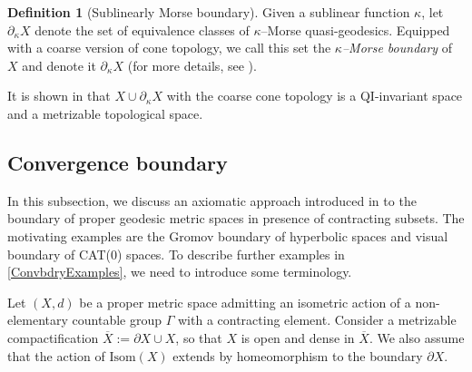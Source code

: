 \documentclass{amsart}
\newtheorem{lem}[thm]{Lemma}
\theoremstyle{definition}
\newtheorem{defn}[thm]{Definition}
\theoremstyle{remark}
\newcommand{\U}{ X}
\newcommand{\bU}{\overline{  X}}
\newcommand{\hU}{\partial_h{  X}}
\newcommand{\pU}{\partial{  X}}
\newcommand{\pka}{\partial_\kappa}
\begin{document}
\begin{defn}[Sublinearly Morse boundary]\label{kappaBdryDefn}
Given a sublinear function $\kappa$, let $\partial_{\kappa}X$ denote the set of equivalence classes of $\kappa$--Morse quasi-geodesics. Equipped with a coarse version of cone topology, we call this set the \emph{$\kappa$--Morse boundary} of $\U$ and denote it $\pka \U$ (for more details, see \cite{QRT2}). 
\end{defn}
It is shown in \cite{QRT2} that $\U\cup \partial_{\kappa}\U$ with the coarse cone topology is a QI-invariant space and a metrizable topological space.

\subsection{Convergence boundary}\label{sec convergence bdry}
In this subsection, we discuss an axiomatic approach introduced in \cite{YANG22} to the boundary of proper geodesic metric spaces in presence of contracting subsets. The motivating examples are the Gromov boundary of hyperbolic spaces and visual boundary of CAT(0) spaces.   To  describe  further examples in \ref{ConvbdryExamples}, we need to introduce some terminology.

Let $(\U, d)$ be a proper metric space admitting an isometric action of a non-elementary countable group $\Gamma$ with a contracting element. Consider a metrizable compactification $\bU:=\pU\cup \U$, so that $\U$ is open and dense in $\bU$. We also assume that the action of $\textrm{Isom}(\U)$ extends by homeomorphism to the boundary  $\pU$. 
\end{document}
